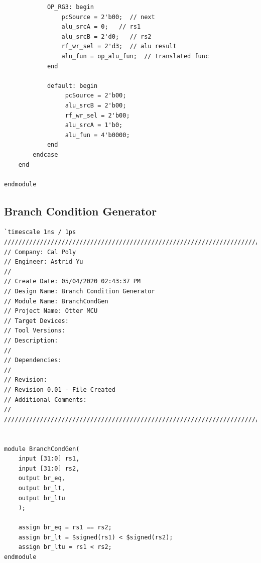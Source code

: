 \documentclass{article}
\begin{document}
\begin{verbatim}
            OP_RG3: begin
                pcSource = 2'b00;  // next
                alu_srcA = 0;   // rs1
                alu_srcB = 2'd0;   // rs2
                rf_wr_sel = 2'd3;  // alu result
                alu_fun = op_alu_fun;  // translated func             
            end

            default: begin
                 pcSource = 2'b00; 
                 alu_srcB = 2'b00; 
                 rf_wr_sel = 2'b00; 
                 alu_srcA = 1'b0; 
                 alu_fun = 4'b0000;
            end
        endcase
    end

endmodule
\end{verbatim}

\pagebreak
\subsection{Branch Condition Generator}

\begin{verbatim}
`timescale 1ns / 1ps
//////////////////////////////////////////////////////////////////////////////////
// Company: Cal Poly
// Engineer: Astrid Yu
// 
// Create Date: 05/04/2020 02:43:37 PM
// Design Name: Branch Condition Generator
// Module Name: BranchCondGen
// Project Name: Otter MCU
// Target Devices: 
// Tool Versions: 
// Description: 
// 
// Dependencies: 
// 
// Revision:
// Revision 0.01 - File Created
// Additional Comments:
// 
//////////////////////////////////////////////////////////////////////////////////


module BranchCondGen(
    input [31:0] rs1,
    input [31:0] rs2,
    output br_eq,
    output br_lt,
    output br_ltu
    );
    
    assign br_eq = rs1 == rs2;
    assign br_lt = $signed(rs1) < $signed(rs2);
    assign br_ltu = rs1 < rs2;
endmodule    
\end{verbatim}
\end{document}

